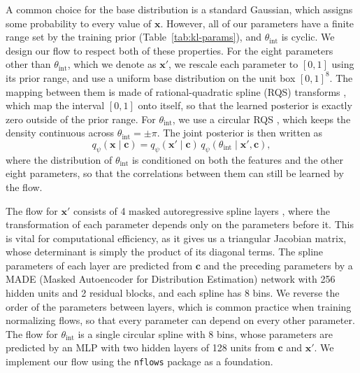 A common choice for the base distribution is a standard Gaussian, which assigns some probability to every value of $\mathbf{x}$. However, all of our parameters have a finite range set by the training prior (Table~\ref{tab:kl-params}), and $\theta_\mathrm{int}$ is cyclic. We design our flow to respect both of these properties. For the eight parameters other than $\theta_\mathrm{int}$, which we denote as $\mathbf{x}'$, we rescale each parameter to $[0, 1]$ using its prior range, and use a uniform base distribution on the unit box $[0, 1]^8$. The mapping between them is made of rational-quadratic spline (RQS) transforms \citep{NeuralSplineFlows}, which map the interval $[0,1]$ onto itself, so that the learned posterior is exactly zero outside of the prior range. For $\theta_\mathrm{int}$, we use a circular RQS \citep{FlowsToriSpheres}, which keeps the density continuous across $\theta_\mathrm{int}=\pm\pi$. The joint posterior is then written as
\begin{equation}
\label{eqn:flow-factorization}
    q_\psi(\mathbf{x} \mid \mathbf{c}) = q_\psi(\mathbf{x}' \mid \mathbf{c})\, q_\psi(\theta_\mathrm{int} \mid \mathbf{x}', \mathbf{c}),
\end{equation}
where the distribution of $\theta_\mathrm{int}$ is conditioned on both the features and the other eight parameters, so that the correlations between them can still be learned by the flow.

The flow for $\mathbf{x}'$ consists of 4 masked autoregressive spline layers \citep{MAF, NeuralSplineFlows}, where the transformation of each parameter depends only on the parameters before it. This is vital for computational efficiency, as it gives us a triangular Jacobian matrix, whose determinant is simply the product of its diagonal terms. The spline parameters of each layer are predicted from $\mathbf{c}$ and the preceding parameters by a MADE (Masked Autoencoder for Distribution Estimation) network \citep{MADE} with 256 hidden units and 2 residual blocks, and each spline has 8 bins. We reverse the order of the parameters between layers, which is common practice when training normalizing flows, so that every parameter can depend on every other parameter. The flow for $\theta_\mathrm{int}$ is a single circular spline with 8 bins, whose parameters are predicted by an MLP with two hidden layers of 128 units from $\mathbf{c}$ and $\mathbf{x}'$. We implement our flow using the \texttt{nflows} package \citep{nflows} as a foundation.

